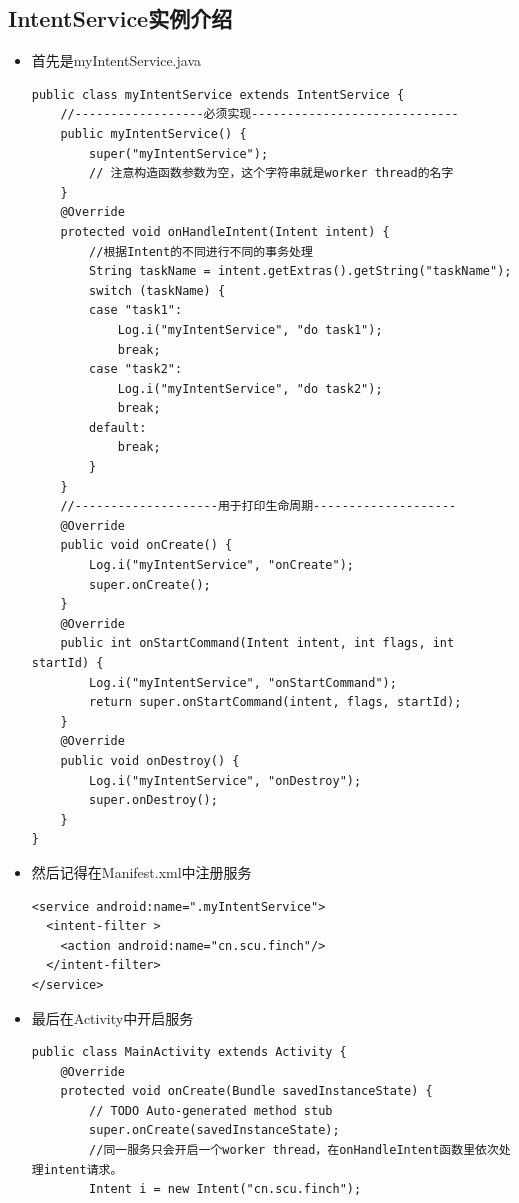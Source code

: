 \documentclass[9pt, b5paper]{article}
\begin{document}
\subsection{IntentService实例介绍}
\label{sec-4-3}
\begin{itemize}
\item 首先是myIntentService.java
\begin{verbatim}
public class myIntentService extends IntentService {
    //------------------必须实现-----------------------------
    public myIntentService() {
        super("myIntentService");
        // 注意构造函数参数为空，这个字符串就是worker thread的名字
    }
    @Override
    protected void onHandleIntent(Intent intent) {
        //根据Intent的不同进行不同的事务处理 
        String taskName = intent.getExtras().getString("taskName");  
        switch (taskName) {
        case "task1":
            Log.i("myIntentService", "do task1");
            break;
        case "task2":
            Log.i("myIntentService", "do task2");
            break;
        default:
            break;
        }        
    }
    //--------------------用于打印生命周期--------------------    
    @Override
    public void onCreate() {
        Log.i("myIntentService", "onCreate");
        super.onCreate();
    }
    @Override
    public int onStartCommand(Intent intent, int flags, int startId) {
        Log.i("myIntentService", "onStartCommand");
        return super.onStartCommand(intent, flags, startId);
    }
    @Override
    public void onDestroy() {
        Log.i("myIntentService", "onDestroy");
        super.onDestroy();
    }
}
\end{verbatim}
\item 然后记得在Manifest.xml中注册服务
\begin{verbatim}
<service android:name=".myIntentService">
  <intent-filter >  
    <action android:name="cn.scu.finch"/>  
  </intent-filter>     
</service>
\end{verbatim}
\item 最后在Activity中开启服务
\begin{verbatim}
public class MainActivity extends Activity {
    @Override
    protected void onCreate(Bundle savedInstanceState) {
        // TODO Auto-generated method stub
        super.onCreate(savedInstanceState);
        //同一服务只会开启一个worker thread，在onHandleIntent函数里依次处理intent请求。
        Intent i = new Intent("cn.scu.finch");  

\end{verbatim}
\end{itemize}
\end{document}
